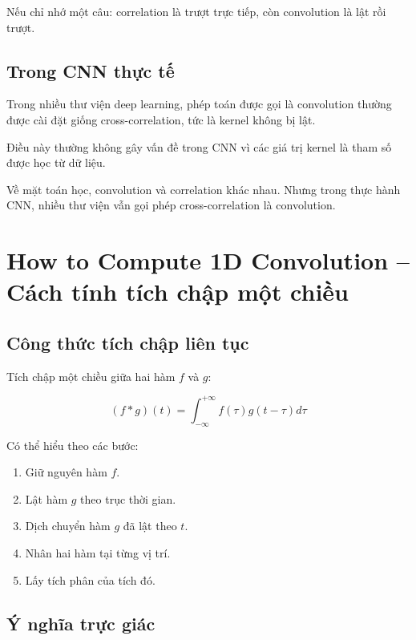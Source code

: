 \begin{ghinho}
Nếu chỉ nhớ một câu: correlation là trượt trực tiếp, còn convolution là lật rồi trượt.
\end{ghinho}

\subsection{Trong CNN thực tế}

Trong nhiều thư viện deep learning, phép toán được gọi là convolution thường được cài đặt giống cross-correlation, tức là kernel không bị lật.

Điều này thường không gây vấn đề trong CNN vì các giá trị kernel là tham số được học từ dữ liệu.

\begin{luuy}
Về mặt toán học, convolution và correlation khác nhau. Nhưng trong thực hành CNN, nhiều thư viện vẫn gọi phép cross-correlation là convolution.
\end{luuy}

\section{How to Compute 1D Convolution -- Cách tính tích chập một chiều}

\subsection{Công thức tích chập liên tục}

Tích chập một chiều giữa hai hàm $f$ và $g$:

\[
    (f*g)(t)
    =
    \int_{-\infty}^{+\infty}
    f(\tau)g(t-\tau)d\tau
\]

Có thể hiểu theo các bước:

\begin{enumerate}[label=\arabic*.]
    \item Giữ nguyên hàm $f$.
    \item Lật hàm $g$ theo trục thời gian.
    \item Dịch chuyển hàm $g$ đã lật theo $t$.
    \item Nhân hai hàm tại từng vị trí.
    \item Lấy tích phân của tích đó.
\end{enumerate}

\subsection{Ý nghĩa trực giác}

